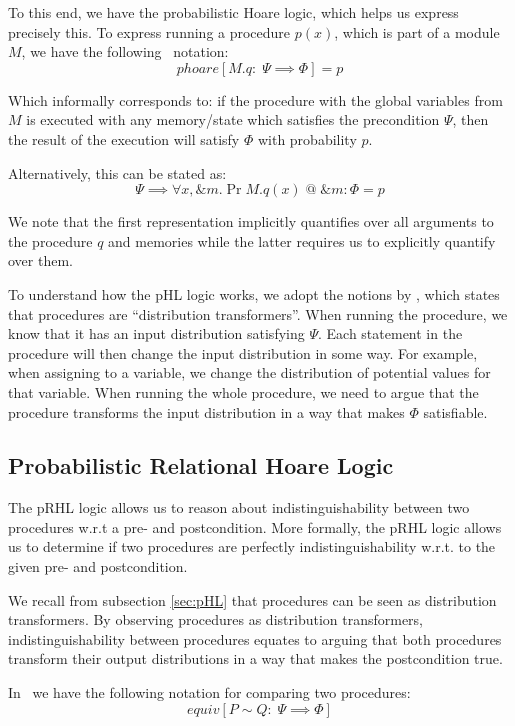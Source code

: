To this end, we have the probabilistic Hoare logic, which helps us express precisely this.
To express running a procedure $p(x)$, which is part of a module $M$, we have the
following \easycrypt\ notation:
\[
  phoare[M.q :\; \Psi \implies \Phi] = p
\]

Which informally corresponds to: if the procedure with the global variables from $M$
is executed with any memory/state which satisfies the precondition $\Psi$, then the
result of the execution will satisfy $\Phi$ with probability $p$.

Alternatively, this can be stated as:
\begin{equation}
  \label{eq:proc_pr}
  \Psi \implies \forall x, \&m.\Pr{M.q(x) \; @ \; \&m : \Phi} = p
\end{equation}

We note that the first representation implicitly quantifies over all
arguments to the procedure $q$ and memories while the latter requires us to
explicitly quantify over them.

To understand how the pHL logic works, we adopt the notions by \citet{ec_intro},
which states that procedures are ``distribution transformers''.
When running the procedure, we know that it has an input distribution satisfying
$\Psi$. Each statement in the procedure will then change the input distribution
in some way. For example, when assigning to a variable, we change the
distribution of potential values for that variable. When running the whole
procedure, we need to argue that the procedure transforms the input distribution
in a way that makes $\Phi$ satisfiable.

\subsection{Probabilistic Relational Hoare Logic}
\label{sec:pRHL}
The pRHL logic allows us to reason about indistinguishability between two
procedures w.r.t a pre- and postcondition. More formally, the pRHL logic
allows us to determine if two procedures are perfectly indistinguishability w.r.t.
to the given pre- and postcondition.

We recall from subsection \ref{sec:pHL} that procedures can be seen as distribution
transformers. By observing procedures as distribution transformers,
indistinguishability between procedures equates to arguing that both procedures
transform their output distributions in a way that makes the postcondition
true.

In \easycrypt\ we have the following notation for comparing two procedures:
\[
  equiv[P \sim Q :\; \Psi \implies \Phi ]
\]

